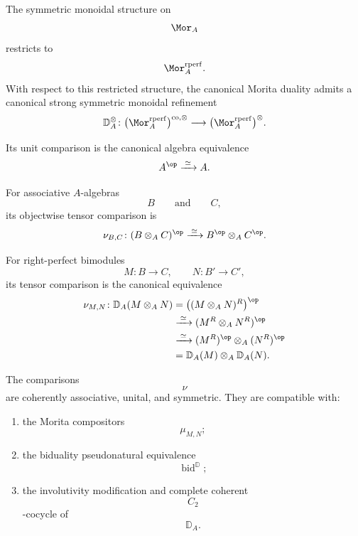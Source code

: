 \begin{proposition}
\label{prop:morita-duality-symmetric-monoidal}
The symmetric monoidal structure on
\[
    \Mor_A
\]
restricts to
\[
    \Mor_A^{\mathrm{rperf}}.
\]
With respect to this restricted structure, the canonical Morita duality
admits a canonical strong symmetric monoidal refinement
\[
    \mathbb D_A^\otimes
    \colon
    \bigl(
        \Mor_A^{\mathrm{rperf}}
    \bigr)^{\mathrm{co},\otimes}
    \longrightarrow
    \bigl(
        \Mor_A^{\mathrm{rperf}}
    \bigr)^\otimes.
\]

Its unit comparison is the canonical algebra equivalence
\[
    A^{\op}
    \xrightarrow{\;\simeq\;}
    A.
\]

For associative $A$-algebras
\[
    B
    \qquad\text{and}\qquad
    C,
\]
its objectwise tensor comparison is
\[
    \nu_{B,C}
    \colon
    (B\otimes_A C)^{\op}
    \xrightarrow{\;\simeq\;}
    B^{\op}\otimes_A C^{\op}.
\]

For right-perfect bimodules
\[
    M
    \colon
    B
    \longrightarrow
    C,
    \qquad
    N
    \colon
    B'
    \longrightarrow
    C',
\]
its tensor comparison is the canonical equivalence
\[
\begin{aligned}
    \nu_{M,N}
    \colon
    \mathbb D_A(M\otimes_A N)
    &=
    \bigl(
        (M\otimes_A N)^R
    \bigr)^{\op}
    \\
    &\xrightarrow{\;\simeq\;}
    (M^R\otimes_A N^R)^{\op}
    \\
    &\xrightarrow{\;\simeq\;}
    (M^R)^{\op}
    \otimes_A
    (N^R)^{\op}
    \\
    &=
    \mathbb D_A(M)\otimes_A\mathbb D_A(N).
\end{aligned}
\]

The comparisons
\[
    \nu
\]
are coherently associative, unital, and symmetric. They are compatible
with:
\begin{enumerate}[label=(\roman*)]
    \item the Morita compositors
    \[
        \mu_{M,N};
    \]

    \item the biduality pseudonatural equivalence
    \[
        \operatorname{bid}^{\mathbb D};
    \]

    \item the involutivity modification and complete coherent
    \[
        C_2
    \]
    -cocycle of
    \[
        \mathbb D_A.
    \]
\end{enumerate}
\end{proposition}

